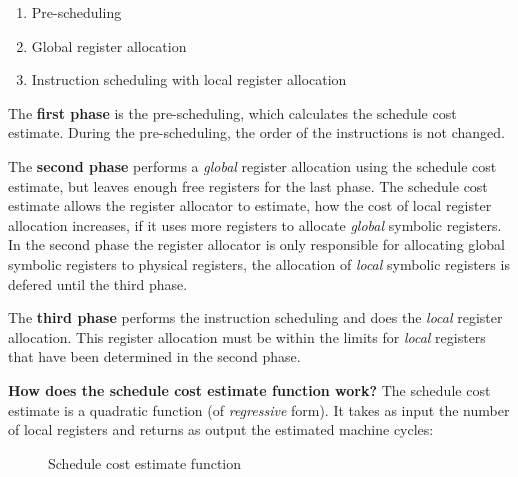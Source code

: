 \documentclass[a4paper,10pt]{article}
\begin{document}
\begin{enumerate}
 \item Pre-scheduling
 \item Global register allocation
 \item Instruction scheduling with local register allocation
\end{enumerate}

The \textbf{first phase} is the pre-scheduling, which calculates the schedule cost estimate. During the pre-scheduling, the order of the 
instructions is not changed.

The \textbf{second phase} performs a \textit{global} register allocation using the schedule cost estimate, but leaves enough free 
registers for the last phase. The schedule cost estimate allows the register allocator to estimate, how the cost of local register 
allocation increases, if it uses more registers to allocate \textit{global} symbolic registers. In the second phase the register 
allocator is only responsible for allocating global symbolic registers to physical registers, the allocation of \textit{local} symbolic 
registers is defered until the third phase.

The \textbf{third phase} performs the instruction scheduling and does the \textit{local} register allocation.  This register allocation 
must be within the limits for \textit{local} registers that have been determined in the second phase.

\textbf{How does the schedule cost estimate function work?} The schedule cost estimate is a quadratic function (of \textit{regressive} 
form). It takes as input the number of local registers and returns as output the estimated machine cycles:
\begin{figure}[h!]
\begin{center}
\end{center}
\caption{Schedule cost estimate function}
\label{schedule-cost-estimate-function}
\end{figure}
\end{document}
